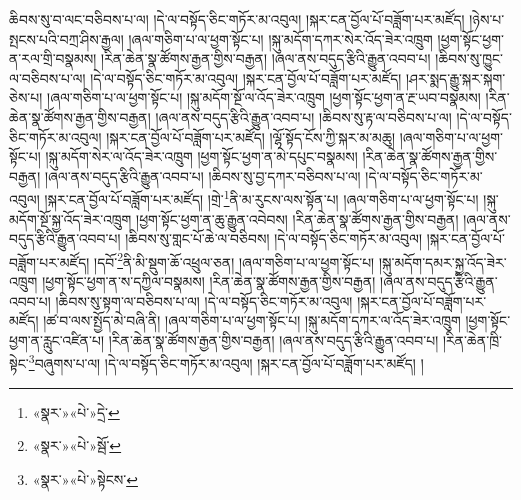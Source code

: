 ཆིབས་སུ་བ་ལང་བཅིབས་པ་ལ། །དེ་ལ་བསྟོད་ཅིང་གཏོར་མ་འབུལ། །སྐར་ངན་བྱོལ་པོ་བཟློག་པར་མཛོད། །ཉེས་པ་སྤངས་པའི་བཀྲ་ཤིས་རྒྱལ། །ཞལ་གཅིག་པ་ལ་ཕྱག་སྟོང་པ། །སྐུ་མདོག་དཀར་སེར་འོད་ཟེར་འཁྲུག །ཕྱག་སྟོང་ཕྱག་ན་རལ་གྲི་བསྣམས། །རིན་ཆེན་སྣ་ཚོགས་རྒྱན་གྱིས་བརྒྱན། །ཞལ་ནས་བདུད་རྩིའི་རྒྱུན་འབབ་པ། །ཆིབས་སུ་ཁྱུང་ལ་བཅིབས་པ་ལ། །དེ་ལ་བསྟོད་ཅིང་གཏོར་མ་འབུལ། །སྐར་ངན་བྱོལ་པོ་བཟློག་པར་མཛོད། །ཤར་སྨད་རྒྱུ་སྐར་སྐག་ཅེས་པ། །ཞལ་གཅིག་པ་ལ་ཕྱག་སྟོང་པ། །སྐུ་མདོག་སྔོ་ལ་འོད་ཟེར་འཁྲུག །ཕྱག་སྟོང་ཕྱག་ན་རྔ་ཡབ་བསྣམས། །རིན་ཆེན་སྣ་ཚོགས་རྒྱན་གྱིས་བརྒྱན། །ཞལ་ནས་བདུད་རྩིའི་རྒྱུན་འབབ་པ། །ཆིབས་སུ་རྟ་ལ་བཅིབས་པ་ལ། །དེ་ལ་བསྟོད་ཅིང་གཏོར་མ་འབུལ། །སྐར་ངན་བྱོལ་པོ་བཟློག་པར་མཛོད། །ལྷོ་སྟོད་ངོས་ཀྱི་སྐར་མ་མཆུ། །ཞལ་གཅིག་པ་ལ་ཕྱག་སྟོང་པ། །སྐུ་མདོག་སེར་ལ་འོད་ཟེར་འཁྲུག །ཕྱག་སྟོང་ཕྱག་ན་མེ་དཔུང་བསྣམས། །རིན་ཆེན་སྣ་ཚོགས་རྒྱན་གྱིས་བརྒྱན། །ཞལ་ནས་བདུད་རྩིའི་རྒྱུན་འབབ་པ། །ཆིབས་སུ་བྱ་དཀར་བཅིབས་པ་ལ། །དེ་ལ་བསྟོད་ཅིང་གཏོར་མ་འབུལ། །སྐར་ངན་བྱོལ་པོ་བཟློག་པར་མཛོད། །གྲེ་\footnote{«སྣར་»«པེ་»དྲེ་}ནི་མ་རུངས་ལས་སྟོན་པ། །ཞལ་གཅིག་པ་ལ་ཕྱག་སྟོང་པ། །སྐུ་མདོག་སྔོ་སྐྱ་འོད་ཟེར་འཁྲུག །ཕྱག་སྟོང་ཕྱག་ན་ཆུ་རྒྱུན་འབེབས། །རིན་ཆེན་སྣ་ཚོགས་རྒྱན་གྱིས་བརྒྱན། །ཞལ་ནས་བདུད་རྩིའི་རྒྱུན་འབབ་པ། །ཆིབས་སུ་གླང་པོ་ཆེ་ལ་བཅིབས། །དེ་ལ་བསྟོད་ཅིང་གཏོར་མ་འབུལ། །སྐར་ངན་བྱོལ་པོ་བཟློག་པར་མཛོད། །དབོ་\footnote{«སྣར་»«པེ་»སྦོ་}ནི་མི་སྡུག་ཆོ་འཕྲུལ་ཅན། །ཞལ་གཅིག་པ་ལ་ཕྱག་སྟོང་པ། །སྐུ་མདོག་དམར་སྐྱ་འོད་ཟེར་འཁྲུག །ཕྱག་སྟོང་ཕྱག་ན་ས་དཀྱིལ་བསྣམས། །རིན་ཆེན་སྣ་ཚོགས་རྒྱན་གྱིས་བརྒྱན། །ཞལ་ནས་བདུད་རྩིའི་རྒྱུན་འབབ་པ། །ཆིབས་སུ་སྟག་ལ་བཅིབས་པ་ལ། །དེ་ལ་བསྟོད་ཅིང་གཏོར་མ་འབུལ། །སྐར་ངན་བྱོལ་པོ་བཟློག་པར་མཛོད། །ཚ་བ་ལས་སྤྱོད་མེ་བཞི་ནི། །ཞལ་གཅིག་པ་ལ་ཕྱག་སྟོང་པ། །སྐུ་མདོག་དཀར་ལ་འོད་ཟེར་འཁྲུག །ཕྱག་སྟོང་ཕྱག་ན་རླུང་འཛིན་པ། །རིན་ཆེན་སྣ་ཚོགས་རྒྱན་གྱིས་བརྒྱན། །ཞལ་ནས་བདུད་རྩིའི་རྒྱུན་འབབ་པ། །རིན་ཆེན་ཁྲི་སྟེང་\footnote{«སྣར་»«པེ་»སྟེངས་}བཞུགས་པ་ལ། །དེ་ལ་བསྟོད་ཅིང་གཏོར་མ་འབུལ། །སྐར་ངན་བྱོལ་པོ་བཟློག་པར་མཛོད། །
